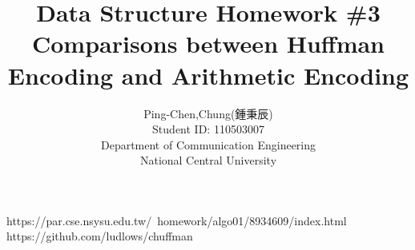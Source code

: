 


\begin{CJK*}{UTF8}{bsmi}


\title{Data Structure Homework \#3 \\ Comparisons between Huffman Encoding and Arithmetic Encoding}
\author{Ping-Chen,Chung(鍾秉辰)\\Student ID: 110503007\\Department of Communication Engineering\\National Central University}

	\maketitle
	\tableofcontents
	\newpage

	\newpage
	







	\begin{thebibliography}{99}  
	 https://par.cse.nsysu.edu.tw/~homework/algo01/8934609/index.html
		https://github.com/ludlows/chuffman


	\end{thebibliography} 


\end{CJK*}

